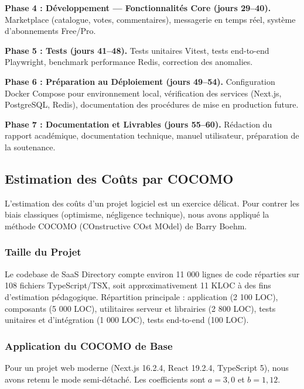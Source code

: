 \textbf{Phase 4 : Développement --- Fonctionnalités Core (jours 29--40).} Marketplace (catalogue, votes, commentaires), messagerie en temps réel, système d'abonnements Free/Pro.

\textbf{Phase 5 : Tests (jours 41--48).} Tests unitaires Vitest, tests end-to-end Playwright, benchmark performance Redis, correction des anomalies.

\textbf{Phase 6 : Préparation au Déploiement (jours 49--54).} Configuration Docker Compose pour environnement local, vérification des services (Next.js, PostgreSQL, Redis), documentation des procédures de mise en production future.

\textbf{Phase 7 : Documentation et Livrables (jours 55--60).} Rédaction du rapport académique, documentation technique, manuel utilisateur, préparation de la soutenance.

\subsection{Estimation des Coûts par COCOMO}

L'estimation des coûts d'un projet logiciel est un exercice délicat. Pour contrer les biais classiques (optimisme, négligence technique), nous avons appliqué la méthode COCOMO (COnstructive COst MOdel) de Barry Boehm.

\subsubsection{Taille du Projet}

Le codebase de SaaS Directory compte environ 11 000 lignes de code réparties sur 108 fichiers TypeScript/TSX, soit approximativement 11 KLOC à des fins d'estimation pédagogique. Répartition principale : application (2 100 LOC), composants (5 000 LOC), utilitaires serveur et librairies (2 800 LOC), tests unitaires et d'intégration (1 000 LOC), tests end-to-end (100 LOC).

\subsubsection{Application du COCOMO de Base}

Pour un projet web moderne (Next.js 16.2.4, React 19.2.4, TypeScript 5), nous avons retenu le mode semi-détaché. Les coefficients sont $a = 3{,}0$ et $b = 1{,}12$.

